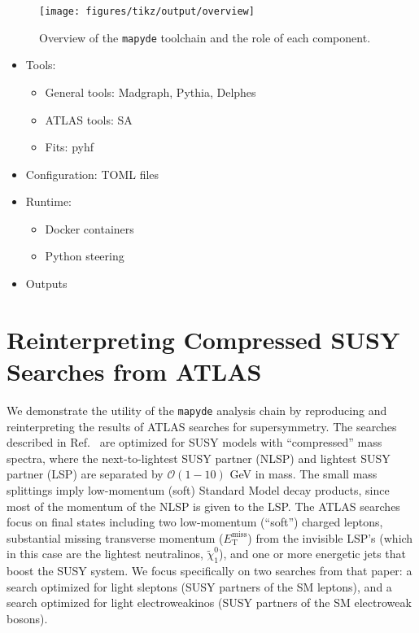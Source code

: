 \documentclass{article}
\newcommand{\chioz}{\ensuremath{\widetilde{\chi}_{1}^{0}}}
\newcommand{\met}{\ensuremath{E_{\mathrm{T}}^{\mathrm{miss}}}}
\newcommand{\mapyde}{\texttt{mapyde}}
\begin{document}
\begin{figure}[tbp]
	\centering
	\texttt{[image: figures/tikz/output/overview]}
	\caption{Overview of the \mapyde{} toolchain and the role of each component.}
	\label{fig:mapydeoverview}
\end{figure}


\begin{itemize}
	\item Tools:
	      \begin{itemize}
		      \item General tools: Madgraph, Pythia, Delphes
		      \item ATLAS tools: SA
		      \item Fits: pyhf
	      \end{itemize}
	\item Configuration: TOML files
	\item Runtime:
	      \begin{itemize}
		      \item Docker containers
		      \item Python steering
	      \end{itemize}
	\item Outputs
\end{itemize}

\section{Reinterpreting Compressed SUSY Searches from ATLAS}
\label{sec:reinterpreting-compressed-susy-searches-from-atlas}

We demonstrate the utility of the \mapyde{} analysis chain by reproducing and reinterpreting the results of ATLAS searches for supersymmetry.  The searches described in Ref.~\cite{ATLAS:2019lng} are optimized for SUSY models with \enquote{compressed} mass spectra, where the next-to-lightest SUSY partner (NLSP) and lightest SUSY partner (LSP) are separated by $\mathcal{O}(1-10)$ GeV in mass.  The small mass splittings imply low-momentum (soft) Standard Model decay products, since most of the momentum of the NLSP is given to the LSP.  The ATLAS searches focus on final states including two low-momentum (\enquote{soft}) charged leptons, substantial missing transverse momentum (\met) from the invisible LSP's (which in this case are the lightest neutralinos, \chioz), and one or more energetic jets that boost the SUSY system.  We focus specifically on two searches from that paper: a search optimized for light sleptons (SUSY partners of the SM leptons), and a search optimized for light electroweakinos (SUSY partners of the SM electroweak bosons).
\end{document}
